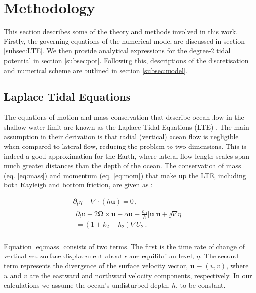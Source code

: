 \section{Methodology}

This section describes some of the theory and methods involved in this work. Firstly, the governing equations of the numerical model are discussed in section \ref{subsec:LTE}. We then provide analytical expressions for the degree-2 tidal potential in section \ref{subsec:pot}. Following this, descriptions of the discretisation and numerical scheme are outlined in section \ref{subsec:model}.

\subsection{Laplace Tidal Equations \label{subsec:LTE}}

The equations of motion and mass conservation that describe ocean flow in the shallow water limit are known as the Laplace Tidal Equations (LTE) \citep{lamb1932hydrodynamics}. The main assumption in their derivation is that radial (vertical) ocean flow is negligible when compared to lateral flow, reducing the problem to two dimensions. This is indeed a good approximation for the Earth, where lateral flow length scales span much greater distances than the depth of the ocean. The conservation of mass (eq. \ref{eq:mass}) and momentum (eq. \ref{eq:mom}) that make up the LTE, including both Rayleigh and bottom friction, are given as \citep{sears1995tidal,tyler2008strong,matsuyama2014tidal}:


\vspace{-0.5cm}
\begin{gather}
\partial_t \eta + \nabla \cdot \left(h \bm{u}\right) = 0\, , \label{eq:mass}\\
\begin{aligned} 
\partial_t \bm{u} + 2 \bm{\Omega} \times \bm{u} + \alpha\bm{u} + \frac{c_D}{h} \left|\bm{u}\right| \bm{u}  + g \nabla \eta \\ = (1 + k_2 - h_2) \nabla U_2 \, . \label{eq:mom}\\
\end{aligned} 
\end{gather}

Equation \ref{eq:mass} consists of two terms. The first is the time rate of change of vertical sea surface displacement about some equilibrium level, $\eta$. The second term represents the divergence of the surface velocity vector, $\bm{u} \equiv (u, v)$, where $u$ and $v$ are the eastward and northward velocity components, respectively. In our calculations we assume the ocean's undisturbed depth, $h$, to be constant. 



